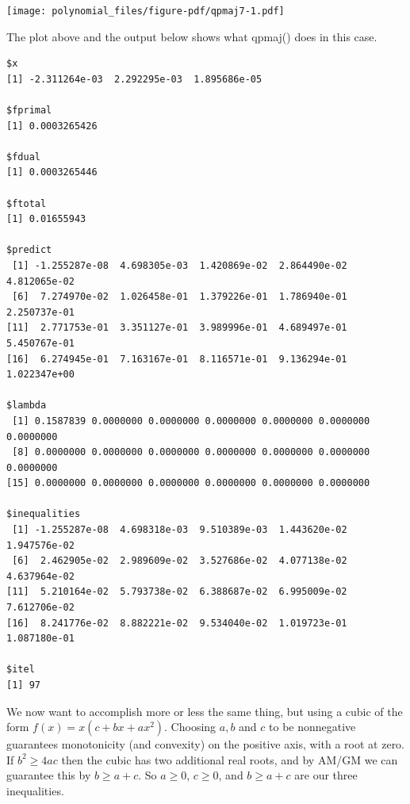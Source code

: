 \documentclass[
  12pt,
  letterpaper,
  DIV=11,
  numbers=noendperiod]{scrreprt}
\theoremstyle{remark}
\begin{document}
\texttt{[image: polynomial\_files/figure-pdf/qpmaj7-1.pdf]}

The plot above and the output below shows what qpmaj() does in this
case.

\begin{verbatim}
$x
[1] -2.311264e-03  2.292295e-03  1.895686e-05

$fprimal
[1] 0.0003265426

$fdual
[1] 0.0003265446

$ftotal
[1] 0.01655943

$predict
 [1] -1.255287e-08  4.698305e-03  1.420869e-02  2.864490e-02  4.812065e-02
 [6]  7.274970e-02  1.026458e-01  1.379226e-01  1.786940e-01  2.250737e-01
[11]  2.771753e-01  3.351127e-01  3.989996e-01  4.689497e-01  5.450767e-01
[16]  6.274945e-01  7.163167e-01  8.116571e-01  9.136294e-01  1.022347e+00

$lambda
 [1] 0.1587839 0.0000000 0.0000000 0.0000000 0.0000000 0.0000000 0.0000000
 [8] 0.0000000 0.0000000 0.0000000 0.0000000 0.0000000 0.0000000 0.0000000
[15] 0.0000000 0.0000000 0.0000000 0.0000000 0.0000000 0.0000000

$inequalities
 [1] -1.255287e-08  4.698318e-03  9.510389e-03  1.443620e-02  1.947576e-02
 [6]  2.462905e-02  2.989609e-02  3.527686e-02  4.077138e-02  4.637964e-02
[11]  5.210164e-02  5.793738e-02  6.388687e-02  6.995009e-02  7.612706e-02
[16]  8.241776e-02  8.882221e-02  9.534040e-02  1.019723e-01  1.087180e-01

$itel
[1] 97
\end{verbatim}

We now want to accomplish more or less the same thing, but using a cubic
of the form \(f(x)=x(c+bx+ax^2)\). Choosing \(a, b\) and \(c\) to be
nonnegative guarantees monotonicity (and convexity) on the positive
axis, with a root at zero. If \(b^2\geq 4ac\) then the cubic has two
additional real roots, and by AM/GM we can guarantee this by
\(b\geq a + c\). So \(a\geq 0\), \(c\geq 0\), and \(b\geq a+c\) are our
three inequalities.
\end{document}
